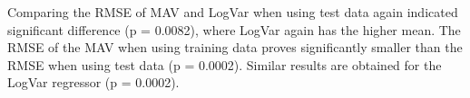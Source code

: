 \documentclass[landscape,a0paper,fontscale=0.375]{baposter} %
\begin{document}
\begin{poster}
{\begin{multicols}{2}
Comparing the RMSE of MAV and LogVar when using test data again indicated significant difference (p = 0.0082), where LogVar again has the higher mean. The RMSE of the MAV when using training data proves significantly smaller than the RMSE when using test data (p = 0.0002). Similar results are obtained for the LogVar regressor (p = 0.0002).

\end{multicols}
\vspace{1em}


%
%
% 
}



%
%
%


\end{poster}
\end{document}

